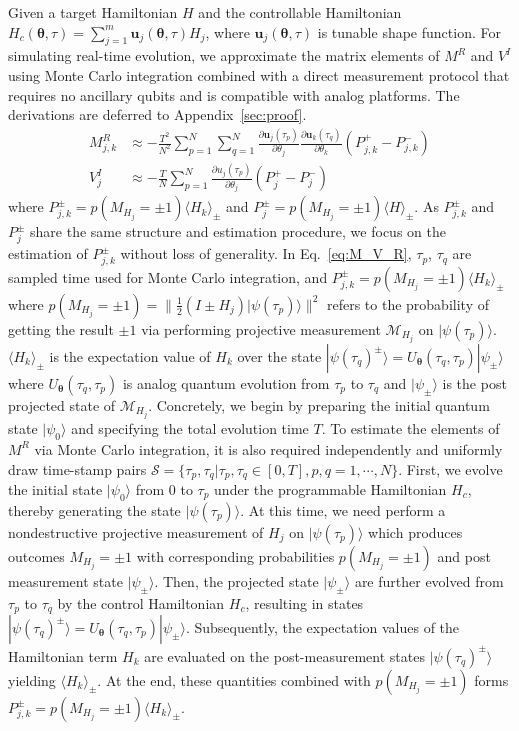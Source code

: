 \documentclass[twocolumn,
pra,aps,superscriptaddress,showpacs,amsmath,amssymb]{revtex4-2}
\begin{document}
Given a target Hamiltonian $H$ and the controllable Hamiltonian $H_c(\bm{\theta},\tau)=\sum_{j=1}^m \bm{u}_j(\bm{\theta},\tau)H_j$, where $\bm{u}_j(\bm{\theta},\tau)$ is tunable shape function. For simulating real-time evolution, we approximate the matrix elements of $M^R$ and $V^I$ using Monte Carlo integration combined with a direct measurement protocol that requires no ancillary qubits and is compatible with analog platforms. The derivations are deferred to Appendix~\ref{sec:proof}.
\begin{align}\label{eq:M_V_R}
M_{j,k}^R & \approx -\frac{T^2}{N^2}\sum_{p=1}^N\sum_{q=1}^N \frac{\partial{\bm{u}_j}(\tau_p)}{\partial{\theta_j}}\frac{\partial{\bm{u}_k}(\tau_q)}{\partial{\theta_k}}\left(P_{j,k}^{+} - P_{j,k}^{-}\right)\nonumber \\
V_{j}^I & \approx -\frac{T}{N}\sum_{p=1}^N \frac{\partial{u_j}(\tau_p)}{\partial{\theta_j}} \left(P_{j}^{+} - P_{j}^{-}\right)
\end{align}
where $P_{j,k}^{\pm} = p(M_{H_j}=\pm1)\langle H_k\rangle_{\pm}$ and $P_{j}^{\pm} = p(M_{H_j}=\pm1)\langle H\rangle_{\pm}$. As $P_{j,k}^{\pm}$ and $P_j^{\pm}$ share the same structure and estimation procedure, we focus on the estimation of $P_{j,k}^{\pm}$ without loss of generality. In Eq.~\eqref{eq:M_V_R}, $\tau_p$, $\tau_q$ are sampled time used for Monte Carlo integration, and $P_{j,k}^{\pm} = p(M_{H_j}=\pm1)\langle H_k\rangle_{\pm}$ where $p(M_{H_j}=\pm 1)=\|\frac{1}{2}(I\pm H_j)|\psi(\tau_p)\rangle\|^2$ refers to the probability of getting the result $\pm 1$ via performing projective measurement $\mathcal{M}_{H_j}$ on $|\psi(\tau_p)\rangle$. $\langle H_k\rangle_{\pm}$ is the expectation value of $H_k$ over the state $|\psi(\tau_q)^{\pm}\rangle=U_{\bm{\theta}}(\tau_q,\tau_p)|\psi_{\pm}\rangle$ where $U_{\bm{\theta}}(\tau_q,\tau_p)$ is analog quantum evolution from $\tau_p$ to $\tau_q$ and $|\psi_{\pm}\rangle$ is the post projected state of $\mathcal{M}_{H_j}$.
Concretely, we begin by preparing the initial quantum state $|\psi_0\rangle$ and specifying the total evolution time $T$. To estimate the elements of $M^R$ via Monte Carlo integration, it is also required independently and uniformly draw time-stamp pairs $\mathcal{S}=\{\tau_p, \tau_q|\tau_p,\tau_q \in [0,T], p,q=1,\cdots,N\}$.
First, we evolve the initial state $|\psi_0\rangle$ from $0$ to $\tau_p$ under the programmable Hamiltonian $H_c$, thereby generating the state $|\psi(\tau_p)\rangle$. At this time, we need perform a nondestructive projective measurement of $H_j$ on $|\psi(\tau_p)\rangle$ which produces outcomes $M_{H_j}=\pm 1$ with corresponding probabilities $p(M_{H_j}=\pm 1)$ and post measurement state $|\psi_{\pm}\rangle$. Then, the projected state $|\psi_{\pm}\rangle$ are further evolved from $\tau_p$ to $\tau_q$ by the control Hamiltonian $H_c$, resulting in states $|\psi(\tau_q)^{\pm}\rangle=U_{\bm{\theta}}(\tau_q,\tau_p)|\psi_{\pm}\rangle$. Subsequently, the expectation values of the Hamiltonian term $H_k$ are evaluated on the post-measurement states $|\psi(\tau_q)^{\pm}\rangle$ yielding $\langle H_k\rangle_{\pm}$. At the end, these quantities combined with $p(M_{H_j}=\pm1)$ forms $P_{j,k}^{\pm}=p(M_{H_j}=\pm1)\langle H_k\rangle_{\pm}$.
\end{document}
